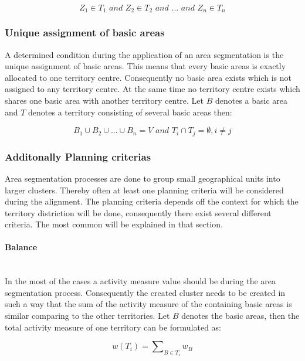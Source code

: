 \[ \mathit{Z_{1} \in T_{1} \text{ and } Z_{2} \in T_{2} \text{ and } ... \text{ and } Z_{n} \in T_{n}}\]

\subsubsection{Unique assignment of basic areas}
A determined condition during the application of an area segmentation is the unique assignment of basic areas. This means that every basic areas is exactly allocated to one territory centre. Consequently no basic area exists which is not assigned to any territory centre. At the same time no territory centre exists which shares one basic area with another territory centre. Let $ B $ denotes a basic area and $ T $ denotes a territory consisting of several basic areas then:

\[ \mathit{B_{1} \cup B_{2} \cup ... \cup B_{n}=V \text{ and } T_{i} \cap T_{j}  =\emptyset, i \neq j}\]


\subsubsection{Additonally Planning criterias}\label{criterias}
Area segmentation processes are done to group small geographical units into larger clusters. Thereby often at least one planning criteria will be considered during the alignment. The planning criteria depends off the context for which the territory distriction will be done, consequently there exist several different criteria. The most common will be explained in that section.

\paragraph{Balance}\mbox{} \\

In the most of the cases a activity measure value should be during the area segmentation process. Consequently the created cluster needs to be created in such a way that the sum of the activity measure of the containing basic areas is similar comparing to the other territories. Let $ B $ denotes the basic areas, then the total activity measure of one territory can be formulated as:

\[ \mathit{w(T_{i}) = \sum\nolimits  _{B \in T_{i}} w_{B}}\]

